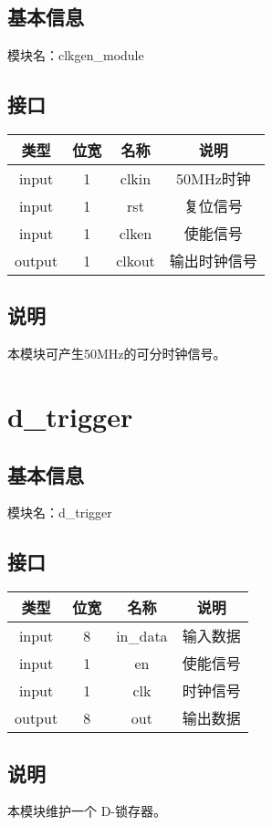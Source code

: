 \subsection{基本信息}
模块名：clkgen\_module
\subsection{接口}
\begin{tabular}{|c|c|c|c|}
    \hline
    类型    &   位宽    &   名称    &   说明\\\hline
    input   &   1   &   clkin &   50MHz时钟\\\hline
    input   &   1   &   rst  &   复位信号\\\hline
    input   &   1   &   clken  &   使能信号\\\hline
    output   &   1   &   clkout  &   输出时钟信号\\\hline
\end{tabular}
\subsection{说明}
本模块可产生50MHz的可分时钟信号。\\

\section{d\_trigger}
\subsection{基本信息}
模块名：d\_trigger
\subsection{接口}
\begin{tabular}{|c|c|c|c|}
    \hline
    类型    &   位宽 &   名称    &   说明\\\hline
    input   &   8   &   in\_data &   输入数据\\\hline
    input   &   1   &   en  &   使能信号\\\hline
    input   &   1   &   clk  &   时钟信号\\\hline
    output  &   8   &   out  &   输出数据\\\hline
\end{tabular}
\subsection{说明}
本模块维护一个 D-锁存器。\\

